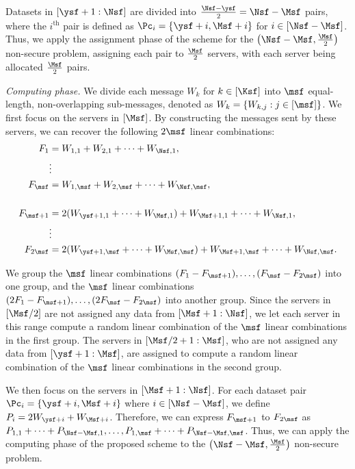 \documentclass[conference,letterpaper]{IEEEtran}
\begin{document}
Datasets in $[\ysf+1 : \Nsf]$ are divided into $\frac{\Nsf-\ysf}{2} = \Nsf-\Msf$ pairs, where the $i^{\text{th}}$ pair is defined as $\Pc_i = \{\ysf+i, \Msf+i\}$ for $i \in [\Nsf-\Msf]$. Thus, we apply the assignment phase of the scheme for the $\left(\Nsf-\Msf, \frac{\Msf}{2}\right)$ non-secure problem, assigning each pair to $\frac{\Msf}{2}$ servers, with each server being allocated $\frac{\Msf}{2}$ pairs.

{\it Computing phase.}
We divide each message $W_k$ for $k \in [\Ksf]$ into $\msf$ equal-length, non-overlapping sub-messages, denoted as $W_k = \{W_{k,j} : j \in [\msf]\}$.
We first focus on the servers in $[\Msf]$. By constructing the messages sent by these servers, we can recover the following $2\msf$ linear combinations:
\begin{align*}
    F_1 &= W_{1,1} + W_{2,1} + \cdots + W_{\Nsf,1}, \\
    &\vdots \\
    F_{\msf} &= W_{1,\msf} + W_{2,\msf} + \cdots + W_{\Nsf,\msf}, \\
    \\
    F_{\msf+1} &= 2(W_{\ysf+1,1} + \cdots + W_{\Msf,1}) + W_{\Msf+1,1} + \cdots + W_{\Nsf,1}, \\
    &\vdots \\
    F_{2\msf} &= 2(W_{\ysf+1,\msf} + \cdots + W_{\Msf,\msf}) + W_{\Msf+1,\msf} + \cdots + W_{\Nsf,\msf}.
\end{align*}

We group the $\msf$ linear combinations $(F_1 - F_{\msf+1}), \ldots, (F_{\msf} - F_{2\msf})$ into one group, and the $\msf$ linear combinations $(2F_1 - F_{\msf+1}), \ldots, (2F_{\msf} - F_{2\msf})$ into another group. Since the servers in $[\Msf/2]$ are not assigned any data from $[\Msf+1: \Nsf]$, we let each server in this range compute a random linear combination of the $\msf$ linear combinations in the first group. The servers in $[\Msf/2+1: \Msf]$, who are not assigned any data from $[\ysf+1: \Msf]$, are assigned to compute a random linear combination of the $\msf$ linear combinations in the second group.

We then focus on the servers in $[\Msf+1: \Nsf]$. For each dataset pair $\Pc_i = \{\ysf+i, \Msf+i\}$ where $i \in [\Nsf - \Msf]$, we define $P_i = 2W_{\ysf+i} + W_{\Msf+i}$. Therefore, we can express $F_{\msf+1}$ to $F_{2\msf}$ as $P_{1,1} + \cdots + P_{\Nsf-\Msf,1}, \ldots, P_{1,\msf} + \cdots + P_{\Nsf-\Msf,\msf}$.
Thus, we can apply the computing phase of the proposed scheme to the $\left(\Nsf - \Msf, \frac{\Msf}{2}\right)$ non-secure problem.
\\
\end{document}
